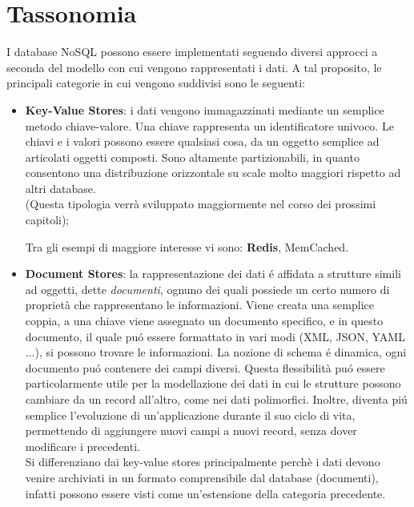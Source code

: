 \section{Tassonomia}
I database NoSQL possono essere implementati seguendo diversi approcci a seconda del modello con cui vengono
rappresentati i dati.
A tal proposito, le principali categorie in cui vengono suddivisi sono le seguenti:
\begin{itemize}
    \item \textbf{Key-Value Stores}: i dati vengono immagazzinati mediante un semplice metodo chiave-valore. Una chiave rappresenta un identificatore
    univoco. Le chiavi e i valori possono essere qualsiasi cosa, da un oggetto semplice ad articolati oggetti composti.
    Sono altamente partizionabili, in quanto consentono una distribuzione orizzontale su scale molto maggiori rispetto ad altri database.\\
    (Questa tipologia verrà sviluppato maggiormente nel corso dei prossimi capitoli);

    Tra gli esempi di maggiore interesse vi sono: \textbf{Redis}, MemCached.
    \item \textbf{Document Stores}: la rappresentazione dei dati é affidata a strutture simili ad oggetti, dette \emph{documenti}, ognuno dei
    quali possiede un certo numero di proprietà che rappresentano le informazioni.
    Viene creata una semplice coppia, a una chiave viene assegnato un documento specifico, e in questo documento, il quale puó essere
    formattato in vari modi (XML, JSON, YAML ...), si possono trovare le informazioni.
    La nozione di schema é dinamica, ogni documento puó contenere dei campi diversi.
    Questa flessibilità puó essere particolarmente
    utile per la modellazione dei dati in cui le strutture possono cambiare da un record all'altro, come nei dati polimorfici.
    Inoltre, diventa piú semplice l'evoluzione di un'applicazione durante il suo ciclo di vita, permettendo di aggiungere
    nuovi campi a nuovi record, senza dover modificare i precedenti.\\
    Si differenziano dai key-value stores principalmente perchè i dati devono venire archiviati
    in un formato comprensibile dal database (documenti), infatti possono essere visti come un'estensione
    della categoria precedente.


\end{itemize}
